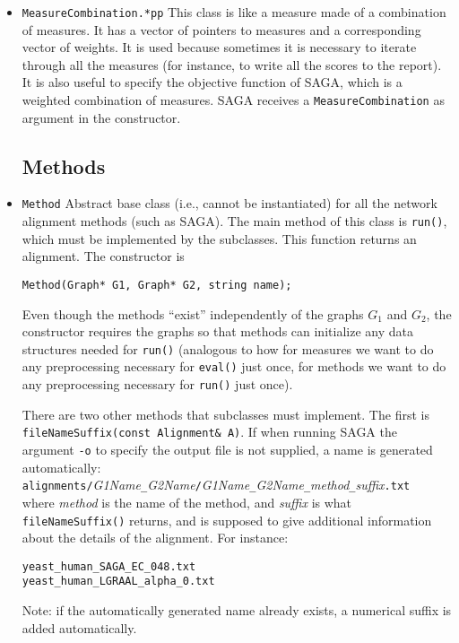 \documentclass[]{article}
\begin{document}
\begin{itemize}
\item \texttt{MeasureCombination.*pp} This class is like a measure made of a combination of measures. It has a vector of pointers to measures and a corresponding vector of weights. It is used because sometimes it is necessary to iterate through all the measures (for instance, to write all the scores to the report). It is also useful to specify the objective function of SAGA, which is a weighted combination of measures. SAGA receives a \texttt{MeasureCombination} as argument in the constructor.

\subsection{Methods}\label{methods}

\item \texttt{Method} Abstract base class (i.e., cannot be instantiated) for all the network alignment methods (such as SAGA). The main method of this class is \texttt{run()}, which must be implemented by the subclasses. This function returns an alignment. The constructor is
\begin{verbatim}
Method(Graph* G1, Graph* G2, string name);
\end{verbatim}
Even though the methods ``exist'' independently of the graphs $G_1$ and $G_2$, the constructor requires the graphs so that methods can initialize any data structures needed for \texttt{run()} (analogous to how for measures we want to do any preprocessing necessary for \texttt{eval()} just once, for methods we want to do any preprocessing necessary for \texttt{run()} just once).

There are two other methods that subclasses must implement. The first is \texttt{fileNameSuffix(const Alignment\& A)}. If when running SAGA the argument \texttt{-o} to specify the output file is not supplied, a name is generated automatically:\\
\texttt{alignments/}\textit{G1Name}\texttt{\_}\textit{G2Name}\texttt{/}\textit{G1Name}\texttt{\_}\textit{G2Name}\texttt{\_}\textit{method}\texttt{\_}\textit{suffix}\texttt{.txt}\\where \textit{method} is the name of the method, and \textit{suffix} is what \texttt{fileNameSuffix()} returns, and is supposed to give additional information about the details of the alignment. For instance:
\begin{verbatim}
yeast_human_SAGA_EC_048.txt
yeast_human_LGRAAL_alpha_0.txt
\end{verbatim}
Note: if the automatically generated name already exists, a numerical suffix is added automatically.


\end{itemize}
\end{document}
